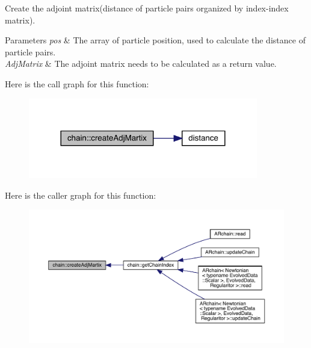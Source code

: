 Create the adjoint matrix(distance of particle pairs organized by index-\/index matrix). 
\begin{DoxyParams}{Parameters}
{\em pos} & The array of particle position, used to calculate the distance of particle pairs. \\
\hline
{\em Adj\+Matrix} & The adjoint matrix needs to be calculated as a return value. \\
\hline
\end{DoxyParams}
Here is the call graph for this function\+:\nopagebreak
\begin{figure}[H]
\begin{center}
\leavevmode
\includegraphics[width=284pt]{namespacechain_a68d5d08ece7d82a6b4bb1968b783a8f3_cgraph}
\end{center}
\end{figure}
Here is the caller graph for this function\+:
\nopagebreak
\begin{figure}[H]
\begin{center}
\leavevmode
\includegraphics[width=350pt]{namespacechain_a68d5d08ece7d82a6b4bb1968b783a8f3_icgraph}
\end{center}
\end{figure}
\mbox{\label{namespacechain_ae008a8273beabf1473c347994197ef53}} 
